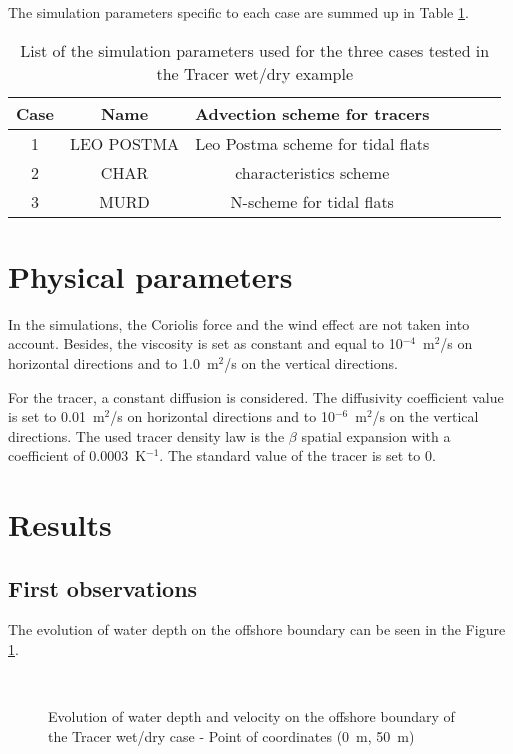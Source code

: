 The simulation parameters specific to each case are summed up in Table \ref{tab:tracerwetdry:cases}.
\begin{table}[H]
    \centering
    \begin{tabular}{|c|c|c|c|c|c|c|}
      \hline Case & Name & Advection scheme for tracers  \\
      \hline 1 & LEO POSTMA &  Leo Postma scheme for tidal flats \\
      \hline 2 & CHAR &  characteristics scheme \\
      \hline 3 & MURD & N-scheme for tidal flats \\
      \hline
    \end{tabular}
  \caption{List of the simulation parameters used for the three cases tested in the Tracer wet/dry example}
  \label{tab:tracerwetdry:cases}
\end{table}

\section{Physical parameters}
In the simulations, the Coriolis force and the wind effect are not taken into account.
Besides, the viscosity is set as constant and equal to 10$^{-4}$~m$^2$/s on
horizontal directions and to 1.0~m$^2$/s on the vertical directions.

For the tracer, a constant diffusion is considered.  The diffusivity coefficient value
is set to 0.01~m$^2$/s on horizontal directions and to 10$^{-6}$~m$^2$/s on the vertical directions.
The used tracer density law is the $\beta$ spatial expansion with a coefficient
of 0.0003~K$^{-1}$. The standard value of the tracer is set to 0.

\section{Results}

\subsection{First observations}
%
The evolution of water depth on the offshore boundary can be seen in the Figure \ref{fig:tracerwetdry:offshoreH}.

\begin{figure}[H]
  \centering
  \mbox{
  }
  \caption{Evolution of water depth and velocity on the offshore boundary of the Tracer wet/dry case - Point of coordinates (0~m, 50~m)}\label{fig:tracerwetdry:offshoreH}
\end{figure}

